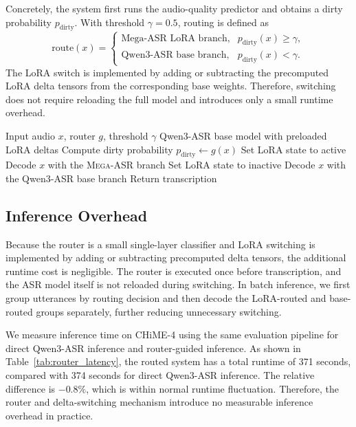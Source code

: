 \documentclass{llmxive}
\begin{document}
Concretely, the system first runs the audio-quality predictor and obtains a
dirty probability $p_{\mathrm{dirty}}$. With threshold $\gamma=0.5$, routing is
defined as
\[
\mathrm{route}(x)=
\begin{cases}
\text{Mega-ASR LoRA branch}, & p_{\mathrm{dirty}}(x)\geq \gamma,\\
\text{Qwen3-ASR base branch}, & p_{\mathrm{dirty}}(x)<\gamma.
\end{cases}
\]
The LoRA switch is implemented by adding or subtracting the precomputed LoRA
delta tensors from the corresponding base weights. Therefore, switching does
not require reloading the full model and introduces only a small runtime
overhead.

\begin{algorithm}[t]
\caption{Router-guided LoRA delta switching for Qwen3-ASR}
\label{alg:router_delta_switch}
\begin{algorithmic}[1]
\Require Input audio $x$, router $g$, threshold $\gamma$
\Require Qwen3-ASR base model with preloaded LoRA deltas
\State Compute dirty probability $p_{\mathrm{dirty}} \leftarrow g(x)$
    \State Set LoRA state to active
    \State Decode $x$ with the \textsc{Mega-ASR} branch
\Else
    \State Set LoRA state to inactive
    \State Decode $x$ with the Qwen3-ASR base branch
\EndIf
\State Return transcription
\end{algorithmic}
\end{algorithm}



\subsection{Inference Overhead}

Because the router is a small single-layer classifier and LoRA switching is
implemented by adding or subtracting precomputed delta tensors, the additional
runtime cost is negligible. The router is executed once before transcription,
and the ASR model itself is not reloaded during switching. In batch inference,
we first group utterances by routing decision and then decode the LoRA-routed
and base-routed groups separately, further reducing unnecessary switching.

We measure inference time on CHiME-4 using the same evaluation pipeline for
direct Qwen3-ASR inference and router-guided inference. As shown in
Table~\ref{tab:router_latency}, the routed system has a total runtime of
371 seconds, compared with 374 seconds for direct Qwen3-ASR inference. The
relative difference is $-0.8\%$, which is within normal runtime fluctuation.
Therefore, the router and delta-switching mechanism introduce no measurable
inference overhead in practice.
\end{document}
